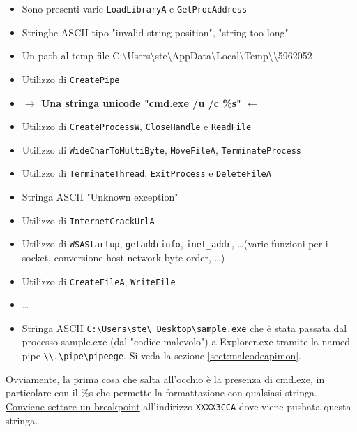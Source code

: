 \documentclass[
    a4paper, %
    11pt %
]{article}
\begin{document}
            \begin{itemize}
                \item Sono presenti varie \texttt{LoadLibraryA} e \texttt{GetProcAddress}
                \item Stringhe ASCII tipo "invalid string position", "string too long"
                \item Un path al temp file C:\textbackslash Users\textbackslash ste\textbackslash AppData\textbackslash Local\textbackslash Temp\textbackslash \textbackslash5962052
                \item Utilizzo di \texttt{CreatePipe}
                \item \textbf{$\rightarrow$ Una stringa unicode "cmd.exe /u /c \%s" $\leftarrow$} 
                \item Utilizzo di \texttt{CreateProcessW}, \texttt{CloseHandle} e \texttt{ReadFile}
                \item Utilizzo di \texttt{WideCharToMultiByte}, \texttt{MoveFileA}, \texttt{TerminateProcess}
                \item Utilizzo di \texttt{TerminateThread}, \texttt{ExitProcess} e \texttt{DeleteFileA}
                \item Stringa ASCII "Unknown exception"
                \item Utilizzo di \texttt{InternetCrackUrlA}
                \item Utilizzo di \texttt{WSAStartup}, \texttt{getaddrinfo}, \texttt{inet\_addr}, \dots (varie
                funzioni per i socket, conversione host-network byte order, \dots)
                \item Utilizzo di \texttt{CreateFileA}, \texttt{WriteFile}
                \item \dots
                \item Stringa ASCII \texttt{C:\textbackslash Users\textbackslash ste\textbackslash 
                Desktop\textbackslash sample.exe} che è stata passata dal processo sample.exe (dal "codice 
                malevolo") a Explorer.exe tramite la named pipe 
                \texttt{\textbackslash\textbackslash.\textbackslash pipe\textbackslash pipeege}. Si veda la sezione \ref{sect:malcodeapimon}.
            \end{itemize}

            Ovviamente, la prima cosa che salta all'occhio è la presenza di cmd.exe, in particolare con il \%s che
            permette la formattazione con qualsiasi stringa.
            \underline{Conviene settare un breakpoint} all'indirizzo \texttt{XXXX3CCA} dove viene pushata questa stringa.
\end{document}
